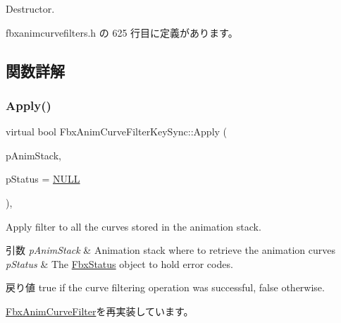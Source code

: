 Destructor. 



 fbxanimcurvefilters.\+h の 625 行目に定義があります。



\subsection{関数詳解}
\mbox{\label{class_fbx_anim_curve_filter_key_sync_a4eb3dd7372f7747bcae1be8722db75e0}} 
\subsubsection{\texorpdfstring{Apply()}{Apply()}\hspace{0.1cm}{\footnotesize\ttfamily [1/5]}}
{\footnotesize\ttfamily virtual bool Fbx\+Anim\+Curve\+Filter\+Key\+Sync\+::\+Apply (\begin{DoxyParamCaption}\item[{\hyperlink{class_fbx_anim_stack}{Fbx\+Anim\+Stack} $\ast$}]{p\+Anim\+Stack,  }\item[{\hyperlink{class_fbx_status}{Fbx\+Status} $\ast$}]{p\+Status = {\ttfamily \hyperlink{fbxarch_8h_a070d2ce7b6bb7e5c05602aa8c308d0c4}{N\+U\+LL}} }\end{DoxyParamCaption})\hspace{0.3cm}{\ttfamily [inline]}, {\ttfamily [virtual]}}

Apply filter to all the curves stored in the animation stack. 
\begin{DoxyParams}{引数}
{\em p\+Anim\+Stack} & Animation stack where to retrieve the animation curves \\
\hline
{\em p\+Status} & The \hyperlink{class_fbx_status}{Fbx\+Status} object to hold error codes. \\
\hline
\end{DoxyParams}
\begin{DoxyReturn}{戻り値}
{\ttfamily true} if the curve filtering operation was successful, {\ttfamily false} otherwise. 
\end{DoxyReturn}


\hyperlink{class_fbx_anim_curve_filter_aef3900e6180e05661c27ee484ae939c3}{Fbx\+Anim\+Curve\+Filter}を再実装しています。



